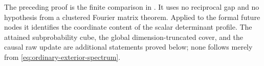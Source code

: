 The preceding proof is the finite comparison in \cite{A1v9note}.
It uses no reciprocal gap and no hypothesis from a clustered Fourier
matrix theorem. Applied to the formal future nodes it identifies the
coordinate content of the scalar determinant profile. The attained
subprobability cube, the global dimension-truncated cover, and the causal
raw update are additional statements proved below; none follows merely
from \eqref{eq:ordinary-exterior-spectrum}.
